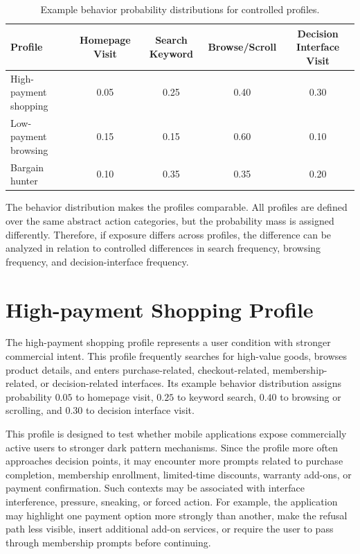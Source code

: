 \begin{table}[htbp]
\centering
\caption{Example behavior probability distributions for controlled profiles.}
\label{tab:profile-behavior-probabilities}
\begin{tabular}{lcccc}
\toprule
\textbf{Profile} & \textbf{Homepage Visit} & \textbf{Search Keyword} & \textbf{Browse/Scroll} & \textbf{Decision Interface Visit} \\
\midrule
High-payment shopping & 0.05 & 0.25 & 0.40 & 0.30 \\
Low-payment browsing & 0.15 & 0.15 & 0.60 & 0.10 \\
Bargain hunter & 0.10 & 0.35 & 0.35 & 0.20 \\
\bottomrule
\end{tabular}
\end{table}

The behavior distribution makes the profiles comparable. All profiles are defined over the same abstract action categories, but the probability mass is assigned differently. Therefore, if exposure differs across profiles, the difference can be analyzed in relation to controlled differences in search frequency, browsing frequency, and decision-interface frequency.

\section{High-payment Shopping Profile}

The high-payment shopping profile represents a user condition with stronger commercial intent. This profile frequently searches for high-value goods, browses product details, and enters purchase-related, checkout-related, membership-related, or decision-related interfaces. Its example behavior distribution assigns probability \(0.05\) to homepage visit, \(0.25\) to keyword search, \(0.40\) to browsing or scrolling, and \(0.30\) to decision interface visit.

This profile is designed to test whether mobile applications expose commercially active users to stronger dark pattern mechanisms. Since the profile more often approaches decision points, it may encounter more prompts related to purchase completion, membership enrollment, limited-time discounts, warranty add-ons, or payment confirmation. Such contexts may be associated with interface interference, pressure, sneaking, or forced action. For example, the application may highlight one payment option more strongly than another, make the refusal path less visible, insert additional add-on services, or require the user to pass through membership prompts before continuing.


